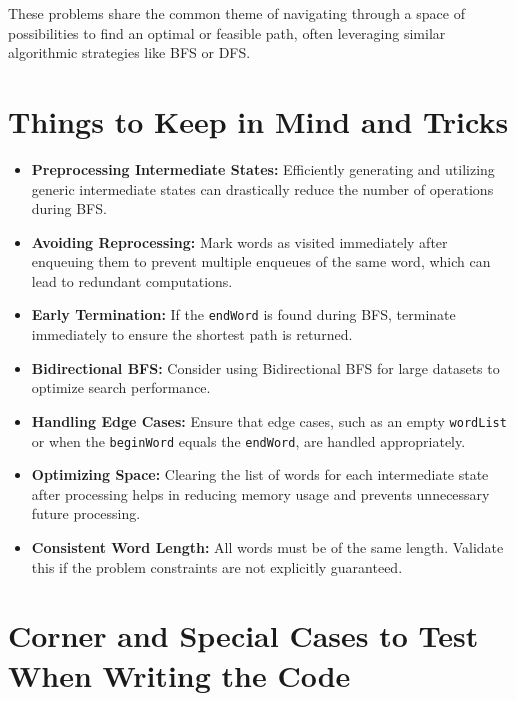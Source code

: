 These problems share the common theme of navigating through a space of possibilities to find an optimal or feasible path, often leveraging similar algorithmic strategies like BFS or DFS.

\section*{Things to Keep in Mind and Tricks}

\begin{itemize}
    \item \textbf{Preprocessing Intermediate States:} Efficiently generating and utilizing generic intermediate states can drastically reduce the number of operations during BFS.
    
    \item \textbf{Avoiding Reprocessing:} Mark words as visited immediately after enqueuing them to prevent multiple enqueues of the same word, which can lead to redundant computations.
    
    \item \textbf{Early Termination:} If the \texttt{endWord} is found during BFS, terminate immediately to ensure the shortest path is returned.
    
    \item \textbf{Bidirectional BFS:} Consider using Bidirectional BFS for large datasets to optimize search performance.
    
    \item \textbf{Handling Edge Cases:} Ensure that edge cases, such as an empty \texttt{wordList} or when the \texttt{beginWord} equals the \texttt{endWord}, are handled appropriately.
    
    \item \textbf{Optimizing Space:} Clearing the list of words for each intermediate state after processing helps in reducing memory usage and prevents unnecessary future processing.
    
    \item \textbf{Consistent Word Length:} All words must be of the same length. Validate this if the problem constraints are not explicitly guaranteed.
\end{itemize}

\section*{Corner and Special Cases to Test When Writing the Code}

